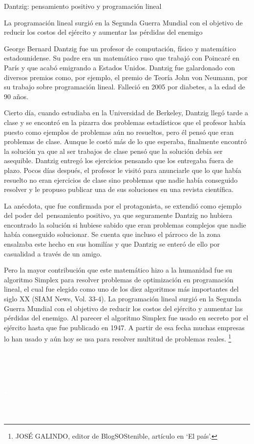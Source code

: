 \vspace{5mm}
\begin{myexampleblock}{
Dantzig: pensamiento positivo y programación lineal}

\vspace{3mm} La programación lineal surgió en la Segunda Guerra Mundial con el objetivo de reducir los costos del ejército y aumentar las pérdidas del enemigo

\vspace{3mm} George Bernard Dantzig fue un profesor de computación, físico y matemático estadounidense. Su padre era un matemático ruso que trabajó con Poincaré en París y que acabó emigrando a Estados Unidos. Dantzig fue galardonado con diversos premios como, por ejemplo, el premio de Teoría John von Neumann, por su trabajo sobre programación lineal. Falleció en 2005 por diabetes, a la edad de 90 años.


\vspace{3mm} Cierto día, cuando estudiaba en la Universidad de Berkeley, Dantzig llegó tarde a clase y se encontró en la pizarra dos problemas estadísticos que el profesor había puesto como ejemplos de problemas aún no resueltos, pero él pensó que eran problemas de clase. Aunque le costó más de lo que esperaba, finalmente encontró la solución ya que al ser trabajos de clase pensó que la solución debía ser asequible. Dantzig entregó los ejercicios pensando que los entregaba fuera de plazo. Pocos días después, el profesor le visitó para anunciarle que lo que había resuelto no eran ejercicios de clase sino problemas que nadie había conseguido resolver y le propuso publicar una de sus soluciones en una revista científica.


\vspace{3mm} La anécdota, que fue confirmada por el protagonista, se extendió como ejemplo del poder del pensamiento positivo, ya que seguramente Dantzig no hubiera encontrado la solución si hubiese sabido que eran problemas complejos que nadie había conseguido solucionar. Se cuenta que incluso el párroco de la zona ensalzaba este hecho en sus homilías y que Dantzig se enteró de ello por casualidad a través de un amigo.

\vspace{3mm} Pero la mayor contribución que este matemático hizo a la humanidad fue su algoritmo Simplex para resolver problemas de optimización en programación lineal, el cual fue elegido como uno de los diez algoritmos más importantes del siglo XX (SIAM News, Vol. 33-4). La programación lineal surgió en la Segunda Guerra Mundial con el objetivo de reducir los costos del ejército y aumentar las pérdidas del enemigo. Al parecer el algoritmo Simplex fue usado en secreto por el ejército hasta que fue publicado en 1947. A partir de esa fecha muchas empresas lo han usado y aún hoy se usa para resolver multitud de problemas reales. \footnote{JOSÉ GALINDO,  editor de BlogSOStenible, artículo en `El país'.}
\end{myexampleblock}

\newpage $\,$ \section*{ \textcolor{white}{.}}

\newpage $\,$

